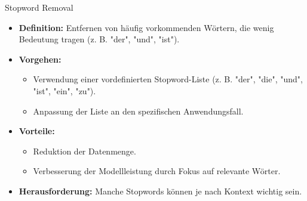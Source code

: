 \documentclass[aspectratio=1610, xcolor=dvipsnames, 9pt]{beamer}
\begin{document}
\begin{frame}{Stopword Removal}
  \begin{itemize}
    \item \textbf{Definition:} Entfernen von häufig vorkommenden Wörtern, die wenig Bedeutung tragen (z. B. "der", "und", "ist").
    \vspace{0.5cm}
    \item \textbf{Vorgehen:}
      \begin{itemize}
        \item Verwendung einer vordefinierten Stopword-Liste (z. B. "der", "die", "und", "ist", "ein", "zu").
        \item Anpassung der Liste an den spezifischen Anwendungsfall.
      \end{itemize}
    \vspace{0.5cm}
    \item \textbf{Vorteile:}
      \begin{itemize}
        \item Reduktion der Datenmenge.
        \item Verbesserung der Modellleistung durch Fokus auf relevante Wörter.
      \end{itemize}
    \item \textbf{Herausforderung:} Manche Stopwords können je nach Kontext wichtig sein.
  \end{itemize}
\end{frame}

\end{document}

